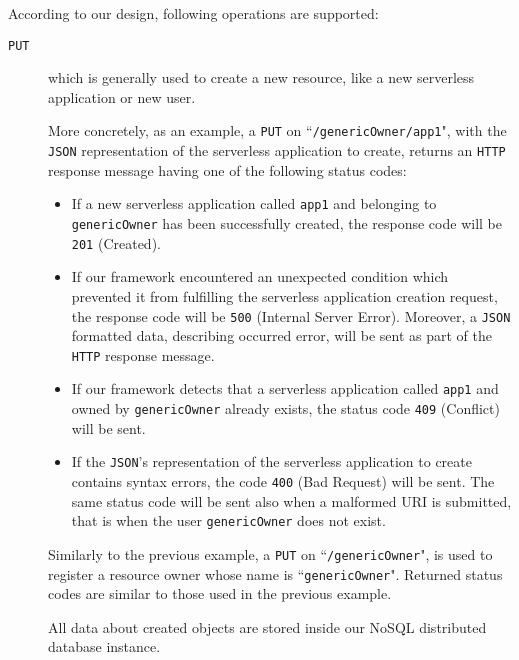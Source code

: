 \documentclass[12pt,a4paper]{report}
\newcommand{\QuoteIntro}{``}
\begin{document}
According to our design, following operations are supported:

\begin{description}
	
	\item[\texttt{PUT}] which is generally used to create a new resource, like a new serverless application or new user. 
		
	More concretely, as an example, a \texttt{PUT} on \QuoteIntro\texttt{/genericOwner/app1}", with the \texttt{JSON} representation of the serverless application to create, returns an \texttt{HTTP} response message having one of the following status codes:
	
	\begin{itemize}
		\item If a new serverless application called \texttt{app1} and belonging to \texttt{genericOwner} has been successfully created, the response code will be \texttt{201} (Created).
		
		\item If our framework encountered an unexpected condition which prevented it from fulfilling the serverless application creation request, the response code will be \texttt{500} (Internal Server Error). Moreover, a \texttt{JSON} formatted data, describing occurred error, will be sent as part of the \texttt{HTTP} response message. 
		
		\item If our framework detects that a serverless application called \texttt{app1} and owned by \texttt{genericOwner} already exists, the status code \texttt{409} (Conflict) will be sent.
		
		\item If the \texttt{JSON}'s representation of the serverless application to create contains syntax errors, the code \texttt{400} (Bad Request) will be sent. The same status code will be sent also when a malformed URI is submitted, that is when the user \texttt{genericOwner} does not exist.
		
	\end{itemize}
	
	Similarly to the previous example, a \texttt{PUT} on \QuoteIntro\texttt{/genericOwner}", is used to register a resource owner whose name is \QuoteIntro\texttt{genericOwner}". Returned status codes are similar to those used in the previous example. 
	
	All data about created objects are stored inside our NoSQL distributed database instance.
	

\end{description}
\end{document}
